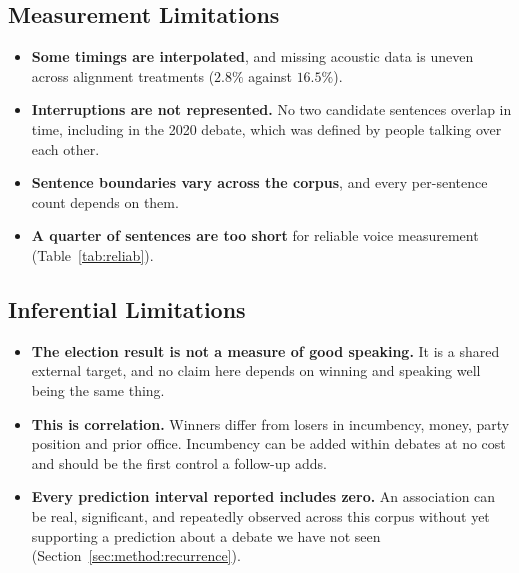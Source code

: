 \documentclass[journal]{IEEEtran}
\begin{document}
\subsection{Measurement Limitations}
\begin{itemize}\itemsep2pt
  \item \textbf{Some timings are interpolated}, and missing acoustic data
        is uneven across alignment treatments ($2.8\%$ against $16.5\%$).
  \item \textbf{Interruptions are not represented.} No two candidate
        sentences overlap in time, including in the 2020 debate, which was
        defined by people talking over each other.
  \item \textbf{Sentence boundaries vary across the corpus}, and every
        per-sentence count depends on them.
  \item \textbf{A quarter of sentences are too short} for reliable voice
        measurement (Table~\ref{tab:reliab}).
\end{itemize}

\subsection{Inferential Limitations}
\begin{itemize}\itemsep2pt
  \item \textbf{The election result is not a measure of good speaking.} It
        is a shared external target, and no claim here depends on winning
        and speaking well being the same thing.
  \item \textbf{This is correlation.} Winners differ from losers in
        incumbency, money, party position and prior office. Incumbency can
        be added within debates at no cost and should be the first control
        a follow-up adds.
  \item \textbf{Every prediction interval reported includes zero.} An
        association can be real, significant, and repeatedly observed
        across this corpus without yet supporting a prediction about a
        debate we have not seen (Section~\ref{sec:method:recurrence}).
\end{itemize}
\end{document}
